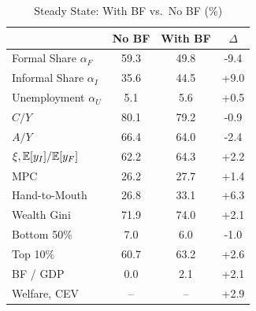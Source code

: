 \begin{table}[htbp]
\centering
\caption{Steady State: With BF vs.\ No BF (\%)}
\label{tab:bf_ss}
\small
\begin{tabular}{lccc}
\toprule
 & No BF & With BF & $\Delta$ \\
\midrule
Formal Share $\alpha_F$ & 59.3 & 49.8 & -9.4 \\
Informal Share $\alpha_I$ & 35.6 & 44.5 & +9.0 \\
Unemployment $\alpha_U$ & 5.1 & 5.6 & +0.5 \\
$C/Y$ & 80.1 & 79.2 & -0.9 \\
$A/Y$ & 66.4 & 64.0 & -2.4 \\
$\xi, \mathbb{E}[y_I]/\mathbb{E}[y_F]$ & 62.2 & 64.3 & +2.2 \\
MPC & 26.2 & 27.7 & +1.4 \\
Hand-to-Mouth & 26.8 & 33.1 & +6.3 \\
Wealth Gini & 71.9 & 74.0 & +2.1 \\
Bottom 50\% & 7.0 & 6.0 & -1.0 \\
Top 10\% & 60.7 & 63.2 & +2.6 \\
BF / GDP & 0.0 & 2.1 & +2.1 \\
Welfare, CEV & -- & -- & +2.9 \\
\bottomrule
\end{tabular}
\end{table}
